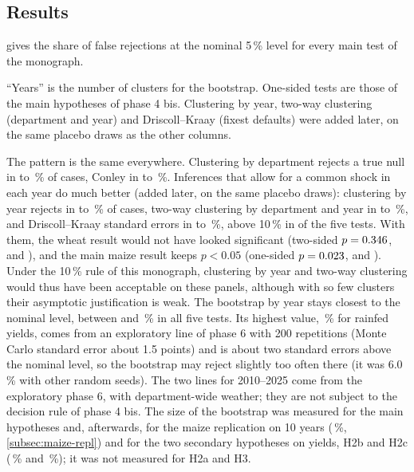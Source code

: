 \subsection{Results}

 gives the share of false rejections at the nominal 5\,\% level for every main test of the monograph.

\begin{table}[H]
\centering
\small
\caption{False rejection rate (\%) at the nominal 5\,\% level, placebo with years permuted}
\label{tab:sizes}
\begin{threeparttable}
{\setlength{\tabcolsep}{4pt}}
\begin{tablenotes}\footnotesize
\item ``Years'' is the number of clusters for the bootstrap. One-sided tests are those of the main hypotheses of phase 4 bis. Clustering by year, two-way clustering (department and year) and Driscoll--Kraay (fixest defaults) were added later, on the same placebo draws as the other columns.
\end{tablenotes}
\end{threeparttable}
\end{table}

The pattern is the same everywhere. Clustering by department rejects a true null in \SizeDepMin{} to \SizeDepMax\,\% of cases, Conley in \SizeConleyMin{} to \SizeConleyMax\,\%. Inferences that allow for a common shock in each year do much better (added later, on the same placebo draws): clustering by year rejects in \SizeYearMin{} to \SizeYearMax\,\% of cases, two-way clustering by department and year in \SizeTwoWayMin{} to \SizeTwoWayMax\,\%, and Driscoll--Kraay standard errors in \SizeDkMin{} to \SizeDkMax\,\%, above 10\,\% in \SizeDkOver{} of the five tests. With them, the wheat result would not have looked significant (two-sided $p = 0.346$, \WheatPtwo{} and \WheatPdk), and the main maize result keeps $p < 0.05$ (one-sided $p = 0.023$, \QonePtwo{} and \QonePdk). Under the 10\,\% rule of this monograph, clustering by year and two-way clustering would thus have been acceptable on these panels, although with so few clusters their asymptotic justification is weak. The bootstrap by year stays closest to the nominal level, between \SizeWcrMin{} and \SizeWcrMax\,\% in all five tests. Its highest value, \SizeWcrMax\,\% for rainfed yields, comes from an exploratory line of phase 6 with 200 repetitions (Monte Carlo standard error about 1.5 points) and is about two standard errors above the nominal level, so the bootstrap may reject slightly too often there (it was 6.0\,\% with other random seeds). The two lines for 2010--2025 come from the exploratory phase 6, with department-wide weather; they are not subject to the decision rule of phase 4 bis. The size of the bootstrap was measured for the main hypotheses and, afterwards, for the maize replication on 10 years (\ReplSize\,\%, \cref{subsec:maize-repl}) and for the two secondary hypotheses on yields, H2b and H2c (\HtwobSize\,\% and \HtwocSize\,\%); it was not measured for H2a and H3.

